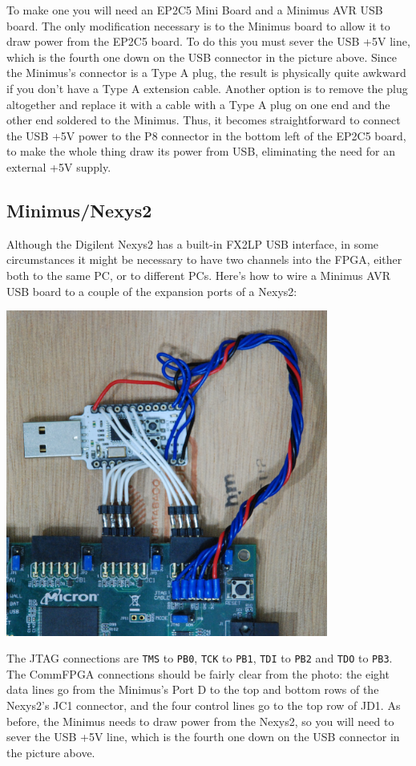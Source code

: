 To make one you will need an EP2C5 Mini Board and a Minimus AVR USB board. The only modification necessary is to the Minimus board to allow it to draw power from the EP2C5 board. To do this you must sever the USB +5V line, which is the fourth one down on the USB connector in the picture above. Since the Minimus's connector is a Type A plug, the result is physically quite awkward if you don't have a Type A extension cable. Another option is to remove the plug altogether and replace it with a cable with a Type A plug on one end and the other end soldered to the Minimus. Thus, it becomes straightforward to connect the USB +5V power to the P8 connector in the bottom left of the EP2C5 board, to make the whole thing draw its power from USB, eliminating the need for an external +5V supply.

\subsection{Minimus/Nexys2}
Although the Digilent Nexys2 has a built-in FX2LP USB interface, in some circumstances it might be necessary to have two channels into the FPGA, either both to the same PC, or to different PCs. Here's how to wire a Minimus AVR USB board to a couple of the expansion ports of a Nexys2:

\vspace*{0.5cm}
\centerline{\includegraphics[width=300pt]{images/nexys2}}

The JTAG connections are \texttt{TMS} to \texttt{PB0}, \texttt{TCK} to \texttt{PB1}, \texttt{TDI} to \texttt{PB2} and \texttt{TDO} to \texttt{PB3}. The CommFPGA connections should be fairly clear from the photo: the eight data lines go from the Minimus's Port D to the top and bottom rows of the Nexys2's JC1 connector, and the four control lines go to the top row of JD1. As before, the Minimus needs to draw power from the Nexys2, so you will need to sever the USB +5V line, which is the fourth one down on the USB connector in the picture above.


